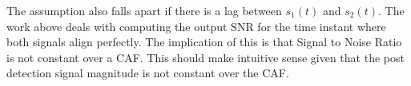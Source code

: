 \documentclass[11pt]{article}
\begin{document}
The assumption also falls apart if there is a lag between $s_1(t)$ and $s_2(t)$. The work above deals with computing the output SNR for the time instant where both signals align perfectly. The implication of this is that Signal to Noise Ratio is not constant over a CAF. This should make intuitive sense given that the post detection signal magnitude is not constant over the CAF.

\end{document}

